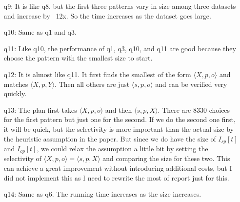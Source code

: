 \documentclass{article}
\begin{document}
\begin{enumerate}
\begin{enumerate}
\item[q9:] It is like q8, but the first three patterns vary in size among three datasets and increase by ~12x. So the time increases as the dataset goes large. 
\item[q10:] Same as q1 and q3. 
\item[q11:] Like q10, the performance of q1, q3, q10, and q11 are good because they choose the pattern with the smallest size to start.
\item[q12:] It is almost like q11. It first finds the smallest of the form $\langle X, p, o\rangle$ and matches $\langle X, p, Y\rangle$. Then all others are just $\langle s, p, o\rangle$ and can be verified very quickly. 
\item[q13:]  The plan first takes $\langle X, p, o\rangle$ and then $\langle s, p, X\rangle$. There are 8330 choices for the first pattern but just one for the second. If we do the second one first, it will be quick, but the selectivity is more important than the actual size by the heuristic assumption in the paper. But since we do have the size of $I_{sp}[t]$ and $I_{op}[t]$, we could relax the assumption a little bit by setting the selectivity of $\langle X, p, o\rangle = \langle s, p, X\rangle$ and comparing the size for these two. This can achieve a great improvement without introducing additional costs, but I did not implement this as I need to rewrite the most of report just for this.
\item[q14:] Same as q6. The running time increases as the size increases. 
\end{enumerate}
\end{enumerate}
\end{document}
